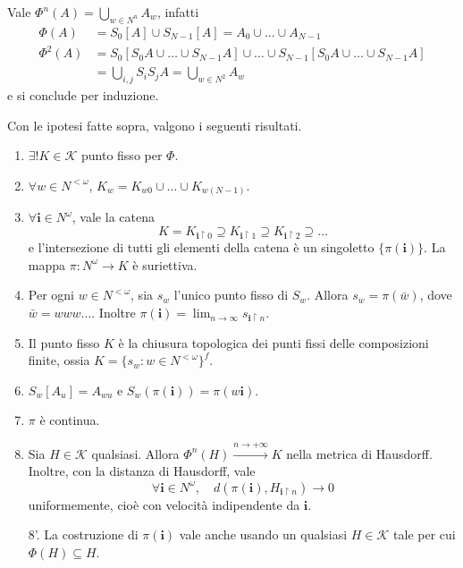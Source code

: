\begin{osservazione}
	Vale $\Phi^{n}(A) = \bigcup_{w\in N^{n}}A_{w}$, infatti 
	\begin{align*}
		\Phi(A) &= S_{0}[A]\cup S_{N-1}[A] = A_{0}\cup\dots\cup A_{N-1}\\
		\Phi^{2}(A) &= S_{0}[S_{0}A\cup\dots\cup S_{N-1}A]\cup\dots\cup S_{N-1}[S_{0}A\cup\dots\cup S_{N-1}A]\\ 
		&= \bigcup_{i,j}S_{i}S_{j}A = \bigcup_{w\in N^{2}}A_{w}
	\end{align*}
	e si conclude per induzione.
\end{osservazione}

\begin{teorema}
	Con le ipotesi fatte sopra, valgono i seguenti risultati.
	\begin{enumerate}
		\item $\exists! K\in\mathcal K$ punto fisso per $\Phi$.
		\item $\forall w\in N^{<\omega}$, $K_{w} = K_{w0}\cup\dots\cup K_{w(N-1)}$.
		\item $\forall\mathbf i\in N^{\omega}$, vale la catena
		$$K = K_{\mathbf i\upharpoonright0} \supseteq K_{\mathbf i\upharpoonright1} \supseteq K_{\mathbf i\upharpoonright2} \supseteq\dots$$
		e l'intersezione di tutti gli elementi della catena è un singoletto $\{\pi(\mathbf i)\}$.
		La mappa $\pi:N^{\omega}\to K$ è suriettiva. 
		\item Per ogni $w\in N^{<\omega}$, sia $s_{w}$ l'unico punto fisso di $S_{w}$. Allora $s_{w} = \pi(\bar w)$, dove $\bar w = www\dots$. Inoltre $\pi(\mathbf i) = \lim_{n\to\infty}s_{\mathbf i\upharpoonright n}$.
		\item Il punto fisso $K$ è la chiusura topologica dei punti fissi delle composizioni finite, ossia $K = \{s_{w}:w\in N^{<\omega}\}^{f}$.
		\item $S_{w}[A_{u}] = A_{wu}$ e $S_{w}(\pi(\mathbf i)) = \pi(w\mathbf i)$.
		\item $\pi$ è continua.
		\item Sia $H\in\mathcal K$ qualsiasi. Allora $\Phi^{n}(H)\xrightarrow{n\to+\infty}K$ nella metrica di Hausdorff. Inoltre, con la distanza di Hausdorff, vale 
		$$\forall \mathbf i \in N^{\omega}, \quad d(\pi(\mathbf i), H_{\mathbf i\upharpoonright n})\to0$$
		uniformemente, cioè con velocità indipendente da $\mathbf i$.
		\item[8'.] La costruzione di $\pi(\mathbf i)$ vale anche usando un qualsiasi $H\in\mathcal K$ tale per cui $\Phi(H)\subseteq H$.
	\end{enumerate}
\end{teorema}
